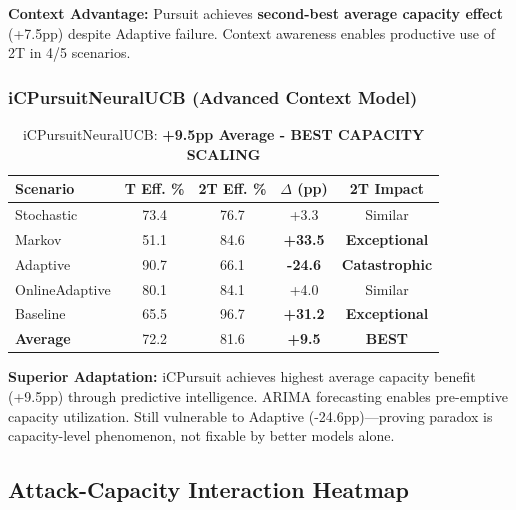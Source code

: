 \documentclass[11pt,a4paper]{article}
\newcommand{\critical}[1]{\textcolor{criticalcolor}{\textbf{#1}}}
\newcommand{\success}[1]{\textcolor{successcolor}{\textbf{#1}}}
\begin{document}
\vspace{-0.2cm}

\textbf{Context Advantage:} Pursuit achieves \success{second-best average capacity effect} (+7.5pp) despite Adaptive failure. Context awareness enables productive use of 2T in 4/5 scenarios.

\subsubsection{iCPursuitNeuralUCB (Advanced Context Model)}

\vspace{-0.4cm}

\begin{table}[H]
\scriptsize
\centering
\begin{tabular}{lcccc}
\toprule
\textbf{Scenario} & \textbf{T Eff. \%} & \textbf{2T Eff. \%} & \textbf{$\Delta$ (pp)} & \textbf{2T Impact} \\
\midrule
Stochastic & 73.4 & 76.7 & +3.3 & Similar \\
Markov & 51.1 & 84.6 & \success{+33.5} & \success{Exceptional} \\
Adaptive & 90.7 & 66.1 & \critical{-24.6} & \critical{Catastrophic} \\
OnlineAdaptive & 80.1 & 84.1 & +4.0 & Similar \\
Baseline & 65.5 & 96.7 & \success{+31.2} & \success{Exceptional} \\
\midrule
\textbf{Average} & 72.2 & 81.6 & \success{+9.5} & \success{BEST} \\
\bottomrule
\end{tabular}
\vspace{-0.2cm}
\caption{iCPursuitNeuralUCB: \success{+9.5pp Average - BEST CAPACITY SCALING}}
\end{table}

\vspace{-0.2cm}

\textbf{Superior Adaptation:} iCPursuit achieves highest average capacity benefit (+9.5pp) through predictive intelligence. ARIMA forecasting enables pre-emptive capacity utilization. Still vulnerable to Adaptive (-24.6pp)—proving paradox is capacity-level phenomenon, not fixable by better models alone.

\subsection{Attack-Capacity Interaction Heatmap}
\end{document}
